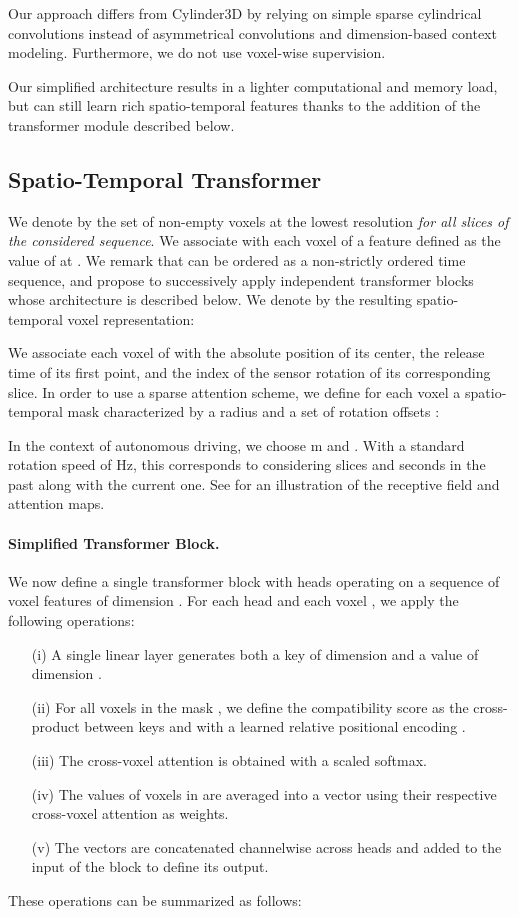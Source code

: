 \documentclass[runningheads]{tpls/llncs}
\begin{document}
Our approach differs from Cylinder3D \cite{zhu2021cylindrical} by relying on simple  sparse cylindrical convolutions instead of asymmetrical convolutions and dimension-based context modeling. Furthermore, we do not use voxel-wise supervision.

Our simplified architecture results in a lighter computational and memory load, but can still learn rich spatio-temporal features thanks to the addition of the transformer module described below.
\subsection{Spatio-Temporal Transformer}
We denote by  the set of non-empty voxels at the lowest resolution  \emph{for all slices of the considered sequence}. 
We associate with each voxel  of  a feature  defined as the value of  at .
We remark that  can be ordered as a non-strictly ordered time sequence, and propose to successively apply  independent transformer blocks  whose architecture is described below. We denote by  the resulting spatio-temporal voxel representation:

We associate each voxel  of  with the absolute position  of its center, the release time  of its first point, and the index  of the sensor rotation of its corresponding slice.
In order to use a sparse attention scheme, we define for each voxel  a spatio-temporal mask  characterized by a radius  and a set of rotation offsets :

In the context of autonomous driving, we choose m and . With a standard rotation speed of Hz, this corresponds to considering slices  and  seconds in the past along with the current one. See  for an illustration of the receptive field and attention maps.

\paragraph{Simplified Transformer Block.} We now define a single transformer block  with  heads operating on a sequence of voxel features  of dimension . For each head  and each voxel , we apply the following operations: 
\begin{itemize}[leftmargin=8mm]
\item [(i)] A single linear layer  generates both a key  of dimension  and a value  of dimension .
\item [(ii)] For all voxels  in the mask , we define the compatibility score  as the cross-product between keys and with a learned relative positional encoding .
\item [(iii)] The cross-voxel attention  is obtained with a scaled softmax.
\item [(iv)] The values  of voxels in  are averaged into a vector  using their respective cross-voxel attention as weights.
\item [(v)] The vectors  are concatenated channelwise across heads and added to the input of the block to define its output.
\end{itemize}
These operations can be summarized as follows:
\end{document}
